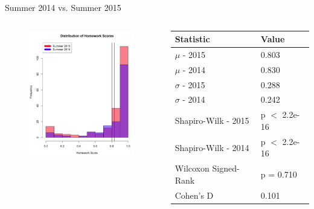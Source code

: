 \documentclass{beamer}
\begin{document}
\begin{frame}{Summer 2014 vs. Summer 2015}
\begin{columns}
\begin{column}{2in}
\begin{figure}
	\includegraphics[width=2in]{img/chapter4/hw_su15_vs_su14}
\end{figure}
\end{column}
\begin{column}{2in}
\begin{scriptsize}
\begin{table}
  \begin{tabular}{|l|l|}
    \hline
    \textbf{Statistic} & \textbf{Value} \\
	\hline
	$\mu$ - 2015 & 0.803 \\
	\hline
	$\mu$ - 2014 & 0.830 \\
	\hline
	$\sigma$ - 2015 & 0.288 \\
	\hline
	$\sigma$ - 2014 & 0.242 \\
	\hline
	Shapiro-Wilk - 2015 & p $<$ 2.2e-16 \\
	\hline
	Shapiro-Wilk - 2014 & p $<$ 2.2e-16 \\
	\hline
	Wilcoxon Signed-Rank & p = 0.710 \\
	\hline
	Cohen's D & 0.101 \\
	\hline
  \end{tabular}
\end{table}
\end{scriptsize}
\end{column}
\end{columns}
\end{frame}
\end{document}
